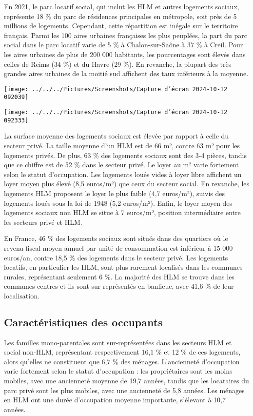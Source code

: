 \documentclass[a4paper, 12pt]{report}
\begin{document}
En 2021, le parc locatif social, qui inclut les HLM et autres logements sociaux, représente 18 \% du parc de résidences principales en métropole, soit près de 5 millions de logements. Cependant, cette répartition est inégale sur le territoire français. Parmi les 100 aires urbaines françaises les plus peuplées, la part du parc social dans le parc locatif varie de 5 \% à Chalon-sur-Saône à 37 \% à Creil. Pour les aires urbaines de plus de 200 000 habitants, les pourcentages sont élevés dans celles de Reims (34 \%) et du Havre (29 \%). En revanche, la plupart des très grandes aires urbaines de la moitié sud affichent des taux inférieurs à la moyenne.
\begin{center}
\texttt{[image: ../../../Pictures/Screenshots/Capture d'écran 2024-10-12 092039]}

\texttt{[image: ../../../Pictures/Screenshots/Capture d'écran 2024-10-12 092333]}
\end{center}

La surface moyenne des logements sociaux est élevée par rapport à celle du secteur privé. La taille moyenne d’un HLM est de 66 m², contre 63 m² pour les logements privés. De plus, 63 \% des logements sociaux sont des 3-4 pièces, tandis que ce chiffre est de 52 \% dans le secteur privé. Le loyer au m² varie fortement selon le statut d’occupation. Les logements loués vides à loyer libre affichent un loyer moyen plus élevé (8,5 euros/m²) que ceux du secteur social. En revanche, les logements HLM proposent le loyer le plus faible (4,7 euros/m²), suivis des logements loués sous la loi de 1948 (5,2 euros/m²). Enfin, le loyer moyen des logements sociaux non HLM se situe à 7 euros/m², position intermédiaire entre les secteurs privé et HLM.

En France, 46 \% des logements sociaux sont situés dans des quartiers où le revenu fiscal moyen annuel par unité de consommation est inférieur à 15 000 euros/an, contre 18,5 \% des logements dans le secteur privé. Les logements locatifs, en particulier les HLM, sont plus rarement localisés dans les communes rurales, représentant seulement 6 \%. La majorité des HLM se trouve dans les communes centres et ils sont sur-représentés en banlieue, avec 41,6 \% de leur localisation.

\subsection{Caractéristiques des occupants}

Les familles mono-parentales sont sur-représentées dans les secteurs HLM et social non-HLM, représentant respectivement 16,1 \% et 12 \% de ces logements, alors qu'elles ne constituent que 6,7 \% des ménages. L’ancienneté d’occupation varie fortement selon le statut d’occupation : les propriétaires sont les moins mobiles, avec une ancienneté moyenne de 19,7 années, tandis que les locataires du parc privé sont les plus mobiles, avec une ancienneté de 5,8 années. Les ménages en HLM ont une durée d’occupation moyenne importante, s'élevant à 10,7 années.
\end{document}
